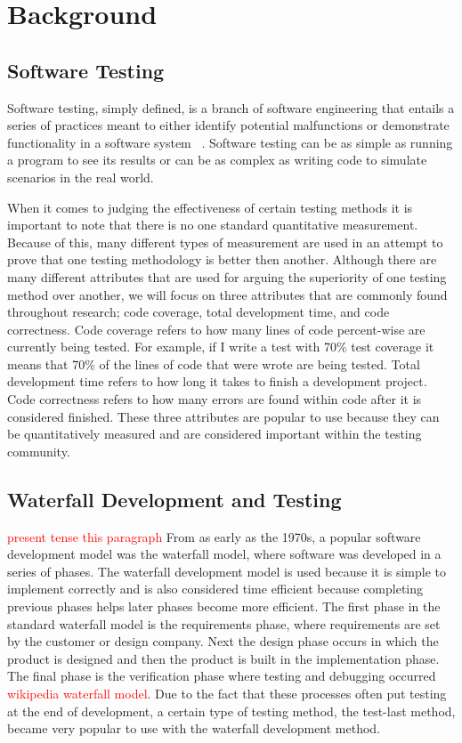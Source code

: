 \documentclass{sig-alternate}
\newcommand{\mycomment}[1]{\textcolor{red}{#1}}
\begin{document}
\section{Background}
\subsection{Software Testing}
Software testing, simply defined, is a branch of software engineering that entails a series of practices meant to either identify potential malfunctions or demonstrate functionality in a software system ~\cite{Bertolino:2007}.  Software testing can be as simple as running a program to see its results or can be as complex as writing code to simulate scenarios in the real world.

When it comes to judging the effectiveness of certain testing methods it is important to note that there is no one standard quantitative measurement.  Because of this, many different types of measurement are used in an attempt to prove that one testing methodology is better then another.  Although there are many different attributes that are used for arguing the superiority of one testing method over another, we will focus on three attributes that are commonly found throughout research; code coverage, total development time, and code correctness.  Code coverage refers to how many lines of code percent-wise are currently being tested. For example, if I write a test with 70\% test coverage it means that 70\% of the lines of code that were wrote are being tested.  Total development time refers to how long it takes to finish a development project.  Code correctness refers to how many errors are found within code after it is considered finished.  These three attributes are popular to use because they can be quantitatively measured and are considered important within the testing community. 

\subsection{Waterfall Development and Testing}
\mycomment{present tense this paragraph}
From as early as the 1970s, a popular software development model was the waterfall model, where software was developed in a series of phases.  The waterfall development model is used because it is simple to implement correctly and is also considered time efficient because completing previous phases helps later phases become more efficient. The first phase in the standard waterfall model is the requirements phase, where requirements are set by the customer or design company.  Next the design phase occurs in which the product is designed and then the product is built in the implementation phase.  The final phase is the verification phase where testing and debugging occurred \mycomment{wikipedia waterfall model}.  Due to the fact that these processes often put testing at the end of development, a certain type of testing method, the test-last method, became very popular to use with the waterfall development method.
\end{document}
